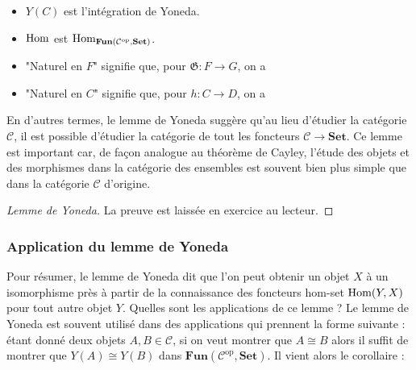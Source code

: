 \documentclass{article}
\begin{document}
\begin{itemize}[label=\textbullet]
    \item $Y(C)$ est l'intégration de Yoneda.
    \item $\text{Hom}$ est $\text{Hom}_{\textbf{Fun}(\mathcal C^\text{op}, \textbf{Set})}$.
    \item "Naturel en $F$" signifie que, pour $\mathfrak G:F\to G$, on a
    \begin{center}
    \end{center}
    \item "Naturel en $C$" signifie que, pour $h:C\to D$, on a
    \begin{center}
    \end{center}
\end{itemize}

En d'autres termes, le lemme de Yoneda suggère qu'au lieu d'étudier la catégorie $\mathcal C$, il est possible d'étudier la catégorie de tout les foncteurs $\mathcal C\to\textbf{Set}$. Ce lemme est important car, de façon analogue au théorème de Cayley, l'étude des objets et des morphismes dans la catégorie des ensembles est souvent bien plus simple que dans la catégorie $\mathcal C$ d'origine.

\begin{proof}[Lemme de Yoneda]{}
    La preuve est laissée en exercice au lecteur.
\end{proof}

\subsubsection{Application du lemme de Yoneda}
Pour résumer, le lemme de Yoneda dit que l'on peut obtenir un objet $X$ à un isomorphisme près à partir de la connaissance des foncteurs hom-set $\text{Hom}(Y, X)$ pour tout autre objet $Y$. Quelles sont les applications de ce lemme ? Le lemme de Yoneda est souvent utilisé dans des applications qui prennent la forme suivante : étant donné deux objets $A, B\in\mathcal C$, si on veut montrer que $A\cong B$ alors il suffit de montrer que $Y(A)\cong Y(B)$ dans $\textbf{Fun}(\mathcal C^\text{op}, \textbf{Set})$. Il vient alors le corollaire :
\end{document}
